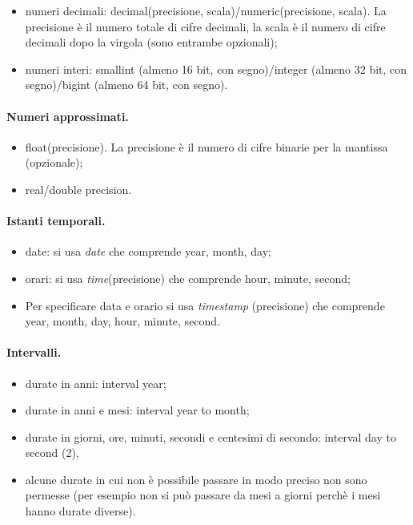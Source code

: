 \begin{itemize}
    \item numeri decimali: decimal(precisione, scala)/numeric(precisione, scala). La precisione è il numero totale di cifre decimali, la scala è il numero di cifre decimali dopo la virgola (sono entrambe opzionali);
    \item numeri interi: smallint (almeno 16 bit, con segno)/integer (almeno 32 bit, con segno)/bigint (almeno 64 bit, con segno).
\end{itemize}

\paragraph{Numeri approssimati.}

\begin{itemize}
    \item float(precisione). La precisione è il numero di cifre binarie per la mantissa (opzionale);
    \item real/double precision.
\end{itemize}

\paragraph{Istanti temporali.}

\begin{itemize}
    \item date: si usa \textit{date} che comprende year, month, day;
    \item orari: si usa \textit{time}(precisione) che comprende hour, minute, second;
    \item Per specificare data e orario si usa \textit{timestamp} (precisione) che comprende year, month, day, hour, minute, second.
\end{itemize}

\paragraph{Intervalli.}

\begin{itemize}
    \item durate in anni: interval year;
    \item durate in anni e mesi: interval year to month;
    \item durate in giorni, ore, minuti, secondi e centesimi di secondo: interval day to second (2),
    \item alcune durate in cui non è possibile passare in modo preciso non sono permesse (per esempio non si può passare da mesi a giorni perchè i mesi hanno durate diverse).
\end{itemize}


